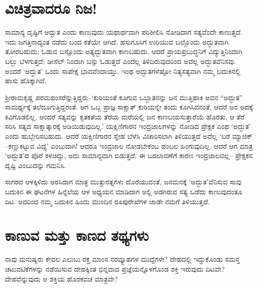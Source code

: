 \section*{ವಿಚಿತ್ರವಾದರೂ ನಿಜ!}


ಸಾಮಾನ್ಯ ದೃಷ್ಟಿಗೆ ಅದ್ಭುತ ಎಂದು ಕಾಣುವುದು ಯಥಾರ್ಥವಾಗಿ ಪರಿಶೀಲಿಸಿ ನೋಡಿದಾಗ ಸತ್ಯವೆಂದೇ ಕಾಣುತ್ತದೆ. ಇದು ಜಗತ್ತಿನಾದ್ಯಂತ ನಡೆದು ಬಂದ ಕತೆಯೇ ಆಗಿದೆ. ಹಸುಗೂಸಿಗೆ ಉರಿಯುವ ಬಲ್ಬೊಂದು ಅದ್ಭುತವಾಗಿ ತೋರಬಹುದು; ಓಡುವ ಬಸ್ಸೊಂದು ಅತ್ಯದ್ಭುತವಾಗಿ ಕಾಣಬಹುದು. ಆದರೆ ಪ್ರಾಯಪ್ರಬುದ್ಧನಿಗೆ ವಿದ್ಯುತ್ತಿನಿಂದಾಗಿ ಬಲ್ಬು ಬೆಳಗುತ್ತದೆ; ಡೀಸೆಲ್ ನಿಂದಾಗಿ ಬಸ್ಸು ಓಡುತ್ತದೆ ಎಂದೆಲ್ಲ ತಿಳಿದಿರುವುದರಿಂದ ಅವೆಲ್ಲ ಅದ್ಭುತವೆನಿಸವು. ಅಂದರೆ ‘ಅದ್ಭುತ’ ಒಂದು ಸಾಪೇಕ್ಷ ಭಾವವೆಂದಾಯ್ತು. ಇಂಥ ಅದ್ಭುತಗಳೆಷ್ಟೋ ನಿತ್ಯಸತ್ಯವಾಗಿ ನಮ್ಮ ಬದುಕಿನಲ್ಲಿ ಹಾಸು ಹೊಕ್ಕಾಗಿವೆ.

ಶ‍್ರೀರಾಮಕೃಷ್ಣ ಪರಮಹಂಸರೆನ್ನುತ್ತಿದ್ದರು–‘ಕುರಿಯಂತೆ ಕೂಗುವ ಒಬ್ಬಾತನನ್ನು ಜನ ಮುತ್ತಿ\-ಹಾಕಿ ಅವನ “ಅದ್ಭುತ” ಸಾಮರ್ಥ್ಯಕ್ಕೆ ತಲೆದೂಗುತ್ತಿದ್ದರಂತೆ. ಆಗ ಒಬ್ಬ ಪ್ರಾಜ್ಞ ಸಾಕ್ಷಾತ್ ಕುರಿಯನ್ನೇ ತಂದು ಕೂಗಿಸಿದನಂತೆ. ಆದರೆ ಜನ ಅದಕ್ಕೆ ಕಿವಿಗೊಡಲಿಲ್ಲ. ಅಂದರೆ ಸತ್ಯವನ್ನು ಕೃತಕತೆಯ ತೆರೆಯ ಮರೆಯಲ್ಲಿ ಜನ ಕಾಣಬಯಸುತ್ತಾರೆಯೆ ಹೊರತು, ಆ ತೆರೆ ಸರಿಸಿ ಸತ್ಯದ ಸಾಕ್ಷಾತ್ಕಾರಕ್ಕೆ ಅಡಿಯಿಡುವುದಿಲ್ಲ.’ ಯಕ್ಷಿಣಿಗಾರನ ಇಂದ್ರಜಾಲಗಳನ್ನು ನೋಡಿದ ಪ್ರೇಕ್ಷಕ ಎಂಥ ‘ಅದ್ಭುತ’ ಎಂದು ಹುಬ್ಬೇರಿಸಬಹುದು. ಆದರೆ ಯಕ್ಷಿಣಿಗಾರನ ಸ್ನೇಹ ಬೆಳೆಸಿ ವಿಚಾರಿಸಲಾಗಿ ತಿಳಿಯುತ್ತದೆ ಅವೆಲ್ಲ ‘ಬರೆ ಮ್ಯಾಜಿಕ್​–ಕಣ್ಣುಕಟ್ಟುವ ವಿದ್ಯೆ’ ಎಂಬುದಾಗಿ! ಆದರೂ ಇಂದ್ರಜಾಲ ನೋಡಬೇಕೆಂಬ ಹಂಬಲ ಹಿಂಗುವುದಿಲ್ಲ. ಆದರೆ ಆಗ ಮಾತ್ರ ‘ಅದ್ಭುತ’ದ ಪೊರೆ ಕಳಚಿದ್ದು, ಅದು ಸಾಮಾನ್ಯವಾಗಿ ಬಿಡುತ್ತದೆ. ಈ ಬದಲಾವಣೆಗೆ ಕಾರಣ ಇಂದ್ರಜಾಲವಲ್ಲ– ಪ್ರೇಕ್ಷಕನ ದೃಷ್ಟಿ ಎಂಬುದನ್ನು ಗಮನಿಸಿ.

ಸಾಗರದ ಆಳಕ್ಕಿಳಿದು ಅರಸಿದಾಗ ಮಾತ್ರ ಮುತ್ತುರತ್ನಗಳು ದೊರೆಯುವಂತೆ, ಜನಮನಕ್ಕೆ ‘ಅದ್ಭುತ’ವೆನಿಸುವ ಸಾವು ಬದುಕಿನ ಈ ಘಟನೆಗಳ ಹಿನ್ನೆಲೆಯ ಆಳ ಅಧ್ಯಯನ ಮಾಡಿದಾಗ ಅಲ್ಲಿ ಅಡಗಿರುವ ಸತ್ಯ ಒಡೆದು ಕಾಣುವುದಂತೂ ದಿಟ. ಅದರಿಂದ ನಮ್ಮ ಬದುಕಿನ ಹಿಂದು ಮುಂದಿನ ರೂಪುರೇಖೆಗಳ ಜಾಡೇ ನಮಗೆ ತಿಳಿಯುತ್ತದೆ.


\section*{ಕಾಣುವ ಮತ್ತು ಕಾಣದ ತಥ್ಯಗಳು}


ನಾವು ಮನುಷ್ಯರು ಕೇವಲ ಎಲುಬು ರಕ್ತ ಮಾಂಸ ನರವ್ಯೂಹಗಳ ಮುದ್ದೆಗಳೇ? ದೇಹದಲ್ಲಿ ಇದ್ದುಕೊಂಡು ಸಮಸ್ತ ಚಟುವಟಿಕೆಗಳನ್ನು ನಡೆಯಿಸುವ ದೇಹಕ್ಕಿಂತ ಭಿನ್ನವಾದ ಪ್ರಜ್ಞೆಯನ್ನೊಳಗೊಂಡ ಶಕ್ತಿ ಇರುವುದು ದಿಟವೇ? ದೇಹವೆನ್ನುವುದು ಆ ಶಕ್ತಿಯ ಹೊರಕವಚ ಮಾತ್ರವೇ?

